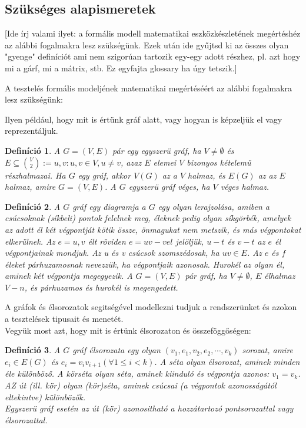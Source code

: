 \documentclass[12pt]{article}
\newtheorem{defin}{Definíció}[section]
\begin{document}
\subsection{Szükséges alapismeretek}
[Ide írj valami ilyet: a formális modell matematikai eszközkészletének megértéshéz az alábbi fogalmakra lesz szükségünk. Ezek után ide gyűjtsd ki az összes olyan "gyenge" definíciót ami nem szigorúan tartozik egy-egy adott részhez, pl. azt hogy mi a gárf, mi a mátrix, stb. Ez egyfajta glossary ha úgy tetszik.]

A tesztelés formális modeljének matematikai megértéséért az alábbi fogalmakra lesz szükségünk:

Ilyen például, hogy mit is értünk gráf alatt, vagy hogyan is képzeljük el vagy reprezentáljuk.

\begin{defin}
A $G = (V,E)$ pár egy egyszerü gráf, ha $V \neq \emptyset$ és $E \subseteq \binom{V}{2} := {{u,v} : u,v \in V, u \neq v}$, azaz $E$ elemei $V$ bizonyos kételemü részhalmazai. Ha $G$ egy gráf, akkor $V(G)$ az a $V$ halmaz, és $E(G)$ az az $E$ halmaz, amire $G = (V,E)$. A $G$ egyszerü gráf véges, ha $V$ véges halmaz. ~\cite{szam:Fleiner}
\end{defin}

\begin{defin}
A $G$ gráf egy diagramja a $G$ egy olyan lerajzolása, amiben a csúcsoknak (síkbeli) pontok felelnek meg, éleknek pedig olyan síkgörbék, amelyek az adott él két végpontját kötik össze, önmagukat nem metszik, és más végpontokat elkerülnek. Az $e = {u, v}$ élt röviden $e = uv-vel$ jelöljük, $u-t$ és $v-t$ az $e$ él végpontjainak mondjuk. Az u és v csúcsok szomszédosak, ha $uv \in E$. Az $e$ és $f$ éleket párhuzamosnak nevezzük, ha végpontjaik azonosak. Hurokél az olyan él, aminek két végpontja megegyezik. A $G = (V,E)$ pár gráf, ha $V \neq \emptyset$, $E$ élhalmaz $V-n$, és párhuzamos és hurokél is megengedett. ~\cite{szam:Fleiner}
\end{defin}

A gráfok és élsorozatok segitségével modellezni tudjuk a rendszerünket és azokon a tesztelések tipusait és menetét.\\

Vegyük most azt, hogy mit is értünk élsorozaton és összeföggőségen:

\begin{defin}
A $G$ gráf élsorozata egy olyan $(v_1,e_1,v_2,e_2,\cdots,v_k)$ sorozat, amire $e_i \in E(G)$ és $e_i = v_iv_{i+1} (\forall 1 \leq i < k)$. A séta olyan élsorozat, aminek minden éle különböző. A körséta olyan séta, aminek kiinduló és végpontja azonos: $v_1 = v_k$. AZ út (ill. kör) olyan (kör)séta, aminek csúcsai (a végpontok azonosságától eltekintve) különbözők.\\
Egyszerü gráf esetén az út (kör) azonositható a hozzátartozó pontsorozattal vagy élsorozattal. ~\cite{szam:Fleiner}
\end{defin}
\end{document}
